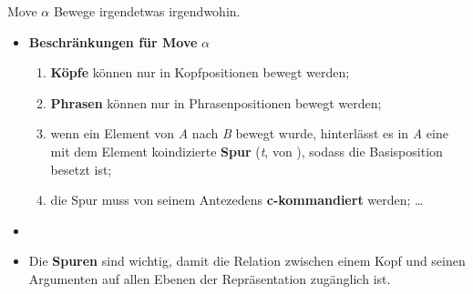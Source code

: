 \begin{frame}
	
	\begin{block}{Move $\alpha$}
		Bewege irgendetwas irgendwohin.
	\end{block}
	
	\begin{itemize}
		\item \textbf{Beschränkungen für Move} $\alpha$
		\begin{enumerate}
			\item \textbf{Köpfe} können nur in Kopfpositionen bewegt werden;
			\item \textbf{Phrasen} können nur in Phrasenpositionen bewegt werden;
			\item wenn ein Element von \emph{A} nach \emph{B} bewegt wurde, hinterlässt es in \emph{A} eine mit dem Element koindizierte \textbf{Spur} (\emph{t}, von ), sodass die Basisposition besetzt ist;
			\item die Spur muss von seinem Antezedens \textbf{c-kommandiert} werden; \dots
		\end{enumerate}
		\item[]
		\item Die \textbf{Spuren} sind wichtig, damit die Relation zwischen einem Kopf und seinen Argumenten auf allen Ebenen der Repräsentation zugänglich ist.
		
	\end{itemize}
	
\end{frame}


